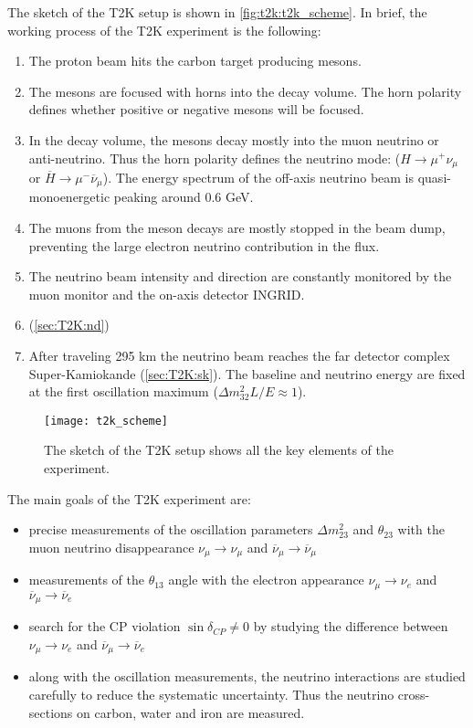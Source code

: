 \documentclass[../main.tex]{subfiles}
\begin{document}
The sketch of the T2K setup is shown in \autoref{fig:t2k:t2k_scheme}. In brief, the working process of the T2K experiment is the following:
\begin{enumerate}
  \item The proton beam hits the carbon target producing mesons.
  \item The mesons are focused with horns into the decay volume. The horn polarity defines whether positive or negative mesons will be focused.
  \item In the decay volume, the mesons decay mostly into the muon neutrino or anti-neutrino. Thus the horn polarity defines the neutrino mode: ($H\to\mu^+\nu_{\mu}$ or $\overline{H}\to\mu^-\overline{\nu}_{\mu}$). The energy spectrum of the off-axis neutrino beam is quasi-monoenergetic peaking around 0.6 GeV.
  \item The muons from the meson decays are mostly stopped in the beam dump, preventing the large electron neutrino contribution in the flux.
  \item The neutrino beam intensity and direction are constantly monitored by the muon monitor and the on-axis detector INGRID.
  \item {}(\autoref{sec:T2K:nd})
  \item After traveling 295 km the neutrino beam reaches the far detector complex Super-Kamiokande (\autoref{sec:T2K:sk}). The baseline and neutrino energy are fixed at the first oscillation maximum ($\Delta m ^2_{32}L/E\approx1$).
\end{enumerate}

\begin{figure}[!ht]
  \centering
  \texttt{[image: t2k\_scheme]}
  \caption{The sketch of the T2K setup shows all the key elements of the experiment.}
  \label{fig:t2k:t2k_scheme}
\end{figure}

The main goals of the T2K experiment are:
\begin{itemize}
  \item precise measurements of the oscillation parameters $\Delta m^2_{23}$ and $\theta_{23}$ with the muon neutrino disappearance $\nu_\mu\to\nu_\mu$ and $\overline{\nu}_\mu\to\overline{\nu}_\mu$
  \item measurements of the  $\theta_{13}$ angle with the electron appearance $\nu_\mu\to\nu_e$ and $\overline{\nu}_\mu\to\overline{\nu}_e$
  \item search for the CP violation $\sin\delta_{CP}\neq0$ by studying the difference between $\nu_\mu\to\nu_e$ and $\overline{\nu}_\mu\to\overline{\nu}_e$
  \item along with the oscillation measurements, the neutrino interactions are studied carefully to reduce the systematic uncertainty. Thus the neutrino cross-sections on carbon, water and iron are measured.
\end{itemize}
\end{document}
